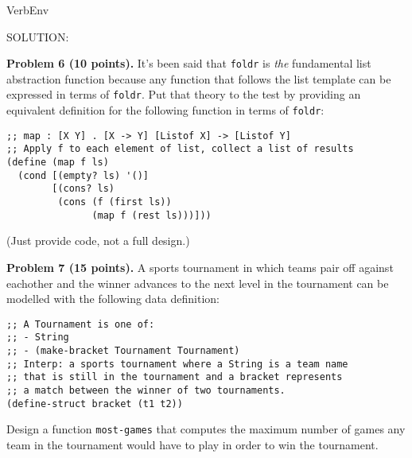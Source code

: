 \documentclass[12pt]{article}
\begin{document}
\begin{SaveVerbatim}{VerbEnv}

SOLUTION:
  
\end{SaveVerbatim}




\newpage

\noindent
{\bf Problem 6 (10 points).}
%
It's been said that {\tt foldr} is \emph{the} fundamental list
abstraction function because any function that follows the list
template can be expressed in terms of {\tt foldr}.  Put that theory to
the test by providing an equivalent definition for the following
function in terms of {\tt foldr}:

\begin{verbatim}
;; map : [X Y] . [X -> Y] [Listof X] -> [Listof Y]
;; Apply f to each element of list, collect a list of results
(define (map f ls)
  (cond [(empty? ls) '()]
        [(cons? ls)
         (cons (f (first ls))
               (map f (rest ls)))]))
\end{verbatim}

\noindent
(Just provide code, not a full design.)

\newpage

\noindent
{\bf Problem 7 (15 points).}
%
A sports tournament in which teams pair off against eachother and
the winner advances to the next level in the tournament can be modelled
with the following data definition:

\begin{verbatim}
;; A Tournament is one of:
;; - String
;; - (make-bracket Tournament Tournament)
;; Interp: a sports tournament where a String is a team name
;; that is still in the tournament and a bracket represents
;; a match between the winner of two tournaments. 
(define-struct bracket (t1 t2))
\end{verbatim}

Design a function {\tt most-games} that computes the maximum number of
games any team in the tournament would have to play in order to win
the tournament.
\end{document}
